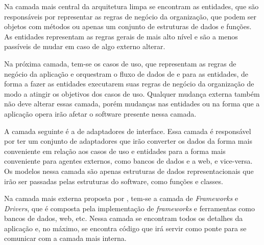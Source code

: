 \documentclass[12pt, %
openright, 
oneside, %
a4paper,    %
brazil]{facom-ufu-abntex2}
\begin{document}
Na camada mais central da arquitetura limpa se encontram as entidades, que são responsáveis por representar as regras de negócio da organização, que podem ser objetos com métodos ou apenas um conjunto de estruturas de dados e funções. As entidades representam as regras gerais de mais alto nível e são a menos passíveis de mudar em caso de algo externo alterar.

Na próxima camada, tem-se os casos de uso, que representam as regras de negócio da aplicação e orquestram o fluxo de dados de e para as entidades, de forma a fazer as entidades executarem suas regras de negócio da organização de modo a atingir os objetivos dos casos de uso. Qualquer mudança externa também não deve alterar essas camada, porém mudanças nas entidades ou na forma que a aplicação opera irão afetar o software presente nessa camada.

A camada seguinte é a de adaptadores de interface. Essa camada é responsável por ter um conjunto de adaptadores que irão converter os dados da forma mais conveniente em relação aos casos de uso e entidades para a forma mais conveniente para agentes externos, como bancos de dados e a web, e vice-versa. Os modelos nessa camada são apenas estruturas de dados representacionais que irão ser passadas pelas estruturas do software, como funções e classes.

Na camada mais externa proposta por , tem-se a camada de \textit{Frameworks} e \textit{Drivers}, que é composta pela implementação de \textit{frameworks} e ferramentas como bancos de dados, web, etc. Nessa camada se encontram todos os detalhes da aplicação e, no máximo, se encontra código que irá servir como ponte para se comunicar com a camada mais interna.
\end{document}
